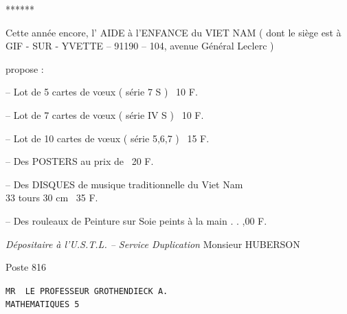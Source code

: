 \begin{center}
\end{center}

\begin{center}******\end{center}

Cette année encore, l' AIDE à l'ENFANCE du VIET NAM ( dont le siège est à GIF - SUR - YVETTE -- 91190 -- 104, avenue Général Leclerc )

propose :

-- Lot de 5 cartes de vœux ( série 7 S ) \dotfill\ 10 F.

-- Lot de 7 cartes de vœux ( série IV S ) \dotfill\ 10 F.

-- Lot de 10 cartes de vœux ( série 5,6,7 ) \dotfill\ 15 F.

-- Des POSTERS au prix de \dotfill\ 20 F.

-- Des DISQUES de musique traditionnelle du Viet Nam\\
\hspace*{3em}33 tours 30 cm \dotfill\ 35 F.

-- Des rouleaux de Peinture sur Soie peints à la main . . ,00 F.

\textit{Dépositaire à l'U.S.T.L. -- Service Duplication} Monsieur HUBERSON

Poste 816

\texttt{MR \ LE PROFESSEUR GROTHENDIECK A.}\\
\texttt{MATHEMATIQUES \hspace{7em} 5}
